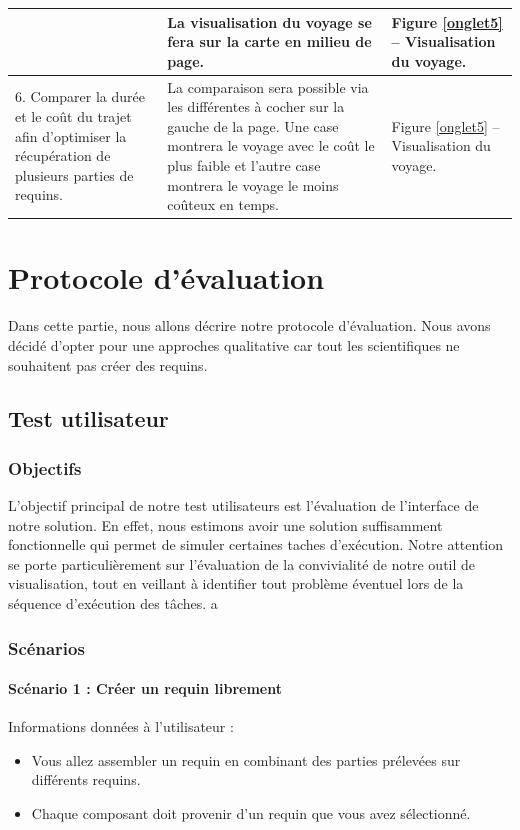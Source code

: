 \documentclass{article}
\begin{document}
\begin{center}
\begin{tabular}{|p{3.5cm}|p{7cm}|p{3.5cm}|}
		&
		La visualisation du voyage se fera sur la carte en milieu de page.
		&
		Figure \ref{onglet5} – Visualisation du voyage.
		\\\hline
		6. Comparer la durée et le coût du trajet afin d’optimiser la récupération de plusieurs parties de requins.
		&
		La comparaison sera possible via les différentes à cocher sur la gauche de la page. Une case montrera le voyage avec le coût le plus faible et l’autre case montrera le voyage le moins coûteux en temps.
		&
		Figure \ref{onglet5} – Visualisation du voyage.
		\\\hline
	\end{tabular}
\end{center}

\section{Protocole d'évaluation}
Dans cette partie, nous allons décrire notre protocole d’évaluation. Nous avons décidé d'opter pour une approches qualitative car tout les scientifiques ne souhaitent pas créer des requins.

\subsection{Test utilisateur}

\subsubsection{Objectifs}
L'objectif principal de notre test utilisateurs est l'évaluation de l'interface de notre solution. En effet, nous estimons avoir une solution suffisamment fonctionnelle qui permet de simuler certaines taches d'exécution. 
Notre attention se porte particulièrement sur l'évaluation de la convivialité de notre outil de visualisation, tout en veillant à identifier tout problème éventuel lors de la séquence d'exécution des tâches.
 a

\subsubsection{Scénarios}

\paragraph{Scénario 1 : Créer un requin librement}
Informations données à l'utilisateur :
\begin{itemize}
    \item Vous allez assembler un requin en combinant des parties prélevées sur différents requins.
    \item Chaque composant doit provenir d'un requin que vous avez sélectionné.
\end{itemize}
\end{document}
